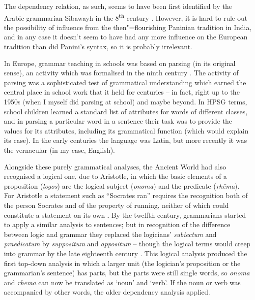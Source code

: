 \documentclass[output=paper]{langscibook}
\begin{document}
The dependency relation, as such, seems to have been first identified by the Arabic grammarian Sibawayh in the 8\textsuperscript{th} century \citep{Owens1988,Kouloughli1999}. However, it is hard to rule out the possibility of influence from the then"=flourishing Paninian tradition in India, and in any case it doesn’t seem to have had any more influence on the European tradition than did Panini’s syntax, so it is probably irrelevant.

In Europe, grammar teaching in schools was based on parsing (in its original sense), an activity which was formalised in the ninth century \citep{Luhtala1994}. The activity of parsing was a sophisticated test of grammatical understanding which earned the central place in school work that it held for centuries – in fact, right up to the 1950s (when I myself did parsing at school) and maybe beyond. In HPSG terms, school children learned a standard list of attributes for words of different classes, and in parsing a particular word in a sentence their task was to provide the values for its attributes, including its grammatical function (which would explain its case). In the early centuries the language was Latin, but more recently it was the vernacular (in my case, English).

Alongside these purely grammatical analyses, the Ancient World had also recognised a logical one, due to Aristotle, in which the basic elements of a proposition (\emph{logos}) are the logical subject (\emph{onoma}) and the predicate (\emph{rhēma}). For Aristotle a statement such as ``Socrates ran'' requires the recognition both of the person Socrates and of the property of running, neither of which could constitute a statement on its own \citep[30–31]{Law2003}. By the twelfth century, grammarians started to apply a similar analysis to sentences; but in recognition of the difference between logic and grammar they replaced the logicians’ \emph{subiectum} and \emph{praedicatum} by \emph{suppositum} and \emph{appositum} – though the logical terms would creep into grammar by the late eighteenth century \citep[168]{Law2003}. This logical analysis produced the first top-down analysis in which a larger unit (the logician’s proposition or the grammarian’s sentence) has parts, but the parts were still single words, so \emph{onoma} and \emph{rhēma} can now be translated as ‘noun’ and ‘verb’. If the noun or verb was accompanied by other words, the older dependency analysis applied.
\end{document}
